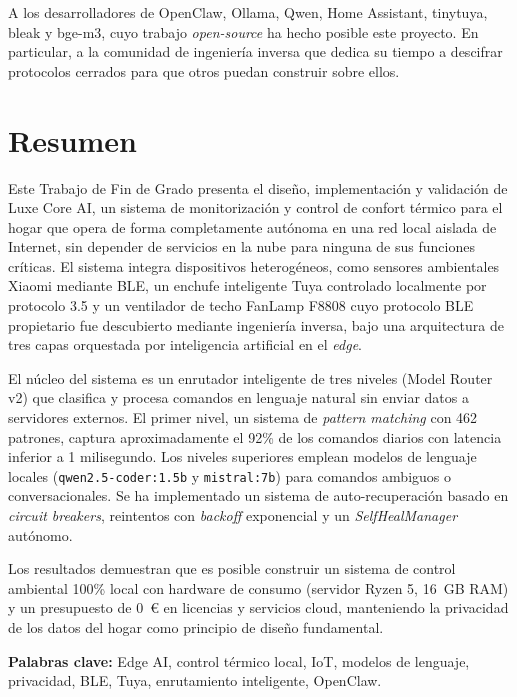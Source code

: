 \documentclass[12pt, a4paper, twoside, openright]{report}
\begin{document}
A los desarrolladores de OpenClaw, Ollama, Qwen, Home Assistant, tinytuya, bleak y bge-m3, cuyo trabajo \textit{open-source} ha hecho posible este proyecto. En particular, a la comunidad de ingeniería inversa que dedica su tiempo a descifrar protocolos cerrados para que otros puedan construir sobre ellos.

\cleardoublepage

\chapter*{Resumen}
\label{ch:resumen}

Este Trabajo de Fin de Grado presenta el diseño, implementación y validación de Luxe Core AI, un sistema de monitorización y control de confort térmico para el hogar que opera de forma completamente autónoma en una red local aislada de Internet, sin depender de servicios en la nube para ninguna de sus funciones críticas. El sistema integra dispositivos heterogéneos, como sensores ambientales Xiaomi mediante BLE, un enchufe inteligente Tuya controlado localmente por protocolo 3.5 y un ventilador de techo FanLamp F8808 cuyo protocolo BLE propietario fue descubierto mediante ingeniería inversa, bajo una arquitectura de tres capas orquestada por inteligencia artificial en el \textit{edge}.

El núcleo del sistema es un enrutador inteligente de tres niveles (Model Router v2) que clasifica y procesa comandos en lenguaje natural sin enviar datos a servidores externos. El primer nivel, un sistema de \textit{pattern matching} con 462 patrones, captura aproximadamente el 92\% de los comandos diarios con latencia inferior a 1 milisegundo. Los niveles superiores emplean modelos de lenguaje locales (\texttt{qwen2.5-coder:1.5b} y \texttt{mistral:7b}) para comandos ambiguos o conversacionales. Se ha implementado un sistema de auto-recuperación basado en \textit{circuit breakers}, reintentos con \textit{backoff} exponencial y un \textit{SelfHealManager} autónomo.

Los resultados demuestran que es posible construir un sistema de control ambiental 100\% local con hardware de consumo (servidor Ryzen 5, 16~GB RAM) y un presupuesto de 0~\euro{} en licencias y servicios cloud, manteniendo la privacidad de los datos del hogar como principio de diseño fundamental.

\vspace{0.5cm}
\noindent\textbf{Palabras clave:} Edge AI, control térmico local, IoT, modelos de lenguaje, privacidad, BLE, Tuya, enrutamiento inteligente, OpenClaw.
\end{document}
